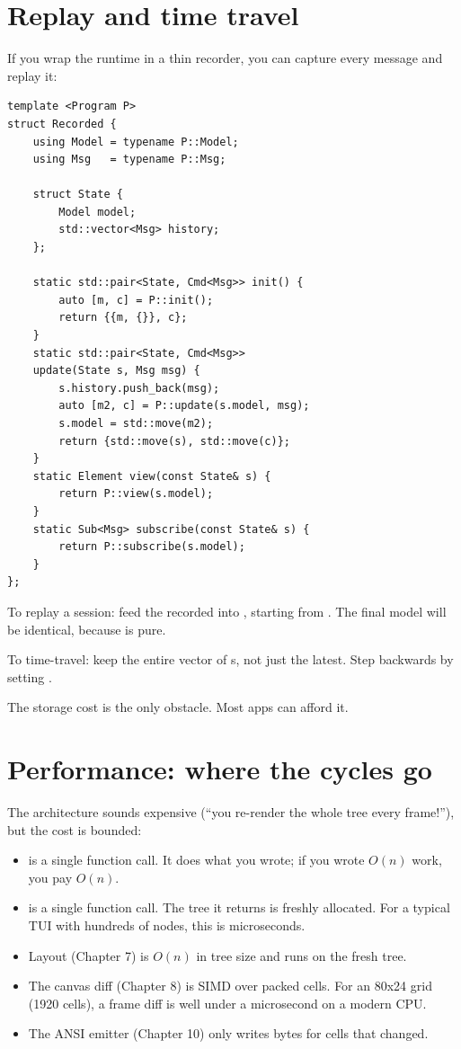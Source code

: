 \section{Replay and time travel}

If you wrap the runtime in a thin recorder, you can capture every
message and replay it:

\begin{lstlisting}
template <Program P>
struct Recorded {
    using Model = typename P::Model;
    using Msg   = typename P::Msg;

    struct State {
        Model model;
        std::vector<Msg> history;
    };

    static std::pair<State, Cmd<Msg>> init() {
        auto [m, c] = P::init();
        return {{m, {}}, c};
    }
    static std::pair<State, Cmd<Msg>>
    update(State s, Msg msg) {
        s.history.push_back(msg);
        auto [m2, c] = P::update(s.model, msg);
        s.model = std::move(m2);
        return {std::move(s), std::move(c)};
    }
    static Element view(const State& s) {
        return P::view(s.model);
    }
    static Sub<Msg> subscribe(const State& s) {
        return P::subscribe(s.model);
    }
};
\end{lstlisting}

To replay a session: feed the recorded  into
, starting from . The final
model will be identical, because  is pure.

To time-travel: keep the entire vector of s, not just
the latest. Step backwards by setting .

The storage cost is the only obstacle. Most apps can afford it.

\section{Performance: where the cycles go}

The architecture sounds expensive (``you re-render the whole tree
every frame!''), but the cost is bounded:

\begin{itemize}[leftmargin=*]
  \item {} is a single function call. It does what you
    wrote; if you wrote $O(n)$ work, you pay $O(n)$.
  \item {} is a single function call. The tree it
    returns is freshly allocated. For a typical TUI with hundreds
    of nodes, this is microseconds.
  \item Layout (Chapter 7) is $O(n)$ in tree size and runs on the
    fresh tree.
  \item The canvas diff (Chapter 8) is SIMD over packed cells.
    For an 80x24 grid (1920 cells), a frame diff is
    well under a microsecond on a modern CPU.
  \item The ANSI emitter (Chapter 10) only writes bytes for cells
    that changed.
\end{itemize}

